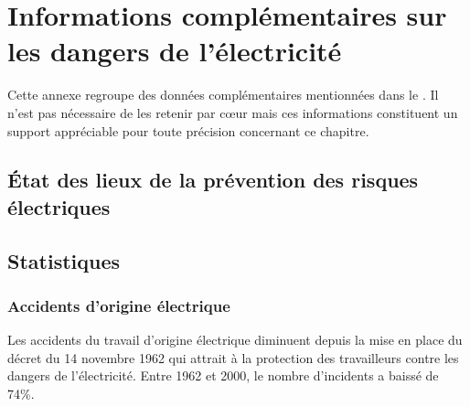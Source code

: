 \chapter{Informations complémentaires sur les dangers de l'électricité}

Cette annexe regroupe des données complémentaires mentionnées dans le . Il n'est pas nécessaire de les retenir par c\oe{}ur mais ces informations constituent un support appréciable pour toute précision concernant ce chapitre.

\section{\'Etat des lieux de la prévention des risques électriques\label{sec:etat_lieux_prevention_electrique}}

\section{Statistiques}

\subsection{Accidents d'origine électrique}

Les accidents du travail d'origine électrique diminuent depuis la mise en place du décret du 14 novembre 1962 qui attrait à la protection des travailleurs contre les dangers de l'électricité. Entre 1962 et 2000, le nombre d'incidents a baissé de 74\%. 

